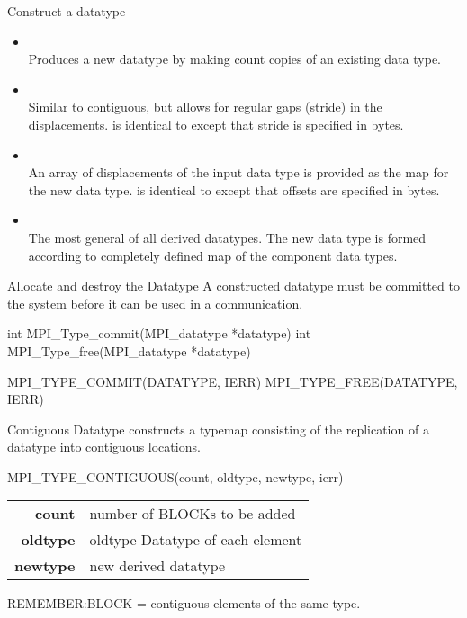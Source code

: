 \documentclass[aspectratio=43]{beamer}
\begin{document}
\begin{frame}[fragile]{Construct a datatype}
\begin{itemize}
\item {}\\
Produces a new datatype by making count copies of an existing data type.

\item {}\\
Similar to contiguous, but allows for regular gaps (stride) in the displacements.
 is identical to  except that stride is specified in bytes.

\item {}\\
An array of displacements of the input data type is provided as the map for the new data type.
 is identical to  except that offsets are specified in bytes.

\item {}\\
The most general of all derived datatypes. The new data type is formed according to completely defined map of the component data types.
\end{itemize}

\end{frame}

\begin{frame}[fragile]{Allocate and destroy the Datatype}
A constructed datatype must be committed to the system before it can be used in a communication.\\
\begin{Cpplisting}[]{}
int MPI_Type_commit(MPI_datatype *datatype)
int MPI_Type_free(MPI_datatype *datatype)
\end{Cpplisting}
\begin{Fortranlisting}[]{}
MPI_TYPE_COMMIT(DATATYPE, IERR)
MPI_TYPE_FREE(DATATYPE, IERR)
\end{Fortranlisting}
\end{frame}

\begin{frame}[fragile]{Contiguous Datatype}
 constructs a typemap consisting of the replication of a datatype into contiguous locations.
\begin{Fortranlisting}[]{}
MPI_TYPE_CONTIGUOUS(count, oldtype, newtype, ierr)
\end{Fortranlisting}
\begin{black1block}{}
\begin{tabular}{rp{8cm}}
\textbf{count} & number of BLOCKs to be added\\
\textbf{oldtype} & oldtype Datatype of each element\\
\textbf{newtype} & new derived datatype\\
\end{tabular}
\end{black1block}
REMEMBER:\@ BLOCK = contiguous elements of the same type.
\end{frame}
\end{document}
